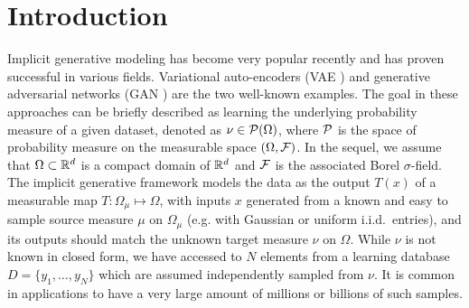 
\section{Introduction}




Implicit generative modeling \cite{diggle1984monte,
  mohamed2016learning} has become very popular recently and has proven
successful in various fields. Variational auto-encoders (VAE
\cite{kingma2013VAE}) and generative adversarial networks (GAN
\cite{goodfellow2014generative}) are the two well-known examples.  The
goal in these approaches can be briefly described as learning the
underlying probability measure of a given dataset, denoted as
$\nu \in {\cal P}(\Omega)$, where ${\cal P}$ is the space of probability measure
on the measurable space $(\Omega,\mathcal{F})$. In the sequel, we assume that
$\Omega \subset \mathbb{R}^d$ is a compact domain of $\mathbb{R}^d$ and $\mathcal{F}$ is the
associated Borel $\sigma$-field. The implicit generative framework
models the data as the output $T(x)$ of a measurable map
$T: \Omega_\mu \mapsto \Omega$, with inputs $x$ generated from a known
and easy to sample source measure $\mu$ on $\Omega_\mu$ (e.g. with
Gaussian or uniform i.i.d.\ entries), and its outputs should match the
unknown target measure $\nu$ on $\Omega$. While $\nu$ is not known in
closed form, we have accessed to $N$ elements from a learning database
$D = \{y_1 , \dots , y_N \}$ which are assumed independently sampled
from $\nu$. It is common in applications to have a very large amount
of millions or billions of such samples.


